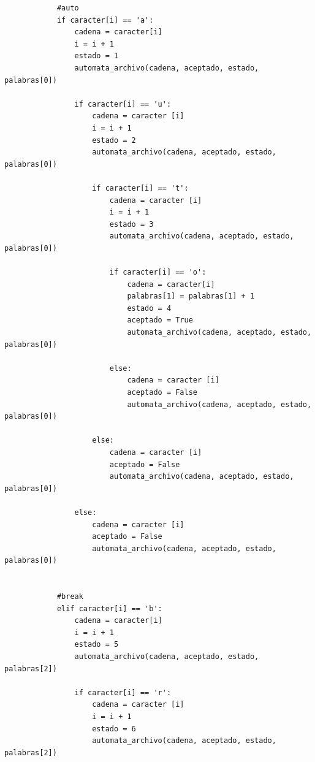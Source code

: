\documentclass{article}
\begin{document}
\begin{flushleft}
\begin{lstlisting}
            #auto
            if caracter[i] == 'a':
                cadena = caracter[i]
                i = i + 1
                estado = 1
                automata_archivo(cadena, aceptado, estado, palabras[0])
                
                if caracter[i] == 'u':
                    cadena = caracter [i]
                    i = i + 1
                    estado = 2
                    automata_archivo(cadena, aceptado, estado, palabras[0])   
                    
                    if caracter[i] == 't':
                        cadena = caracter [i]
                        i = i + 1
                        estado = 3
                        automata_archivo(cadena, aceptado, estado, palabras[0])
                        
                        if caracter[i] == 'o':
                            cadena = caracter[i]
                            palabras[1] = palabras[1] + 1
                            estado = 4
                            aceptado = True
                            automata_archivo(cadena, aceptado, estado, palabras[0])
                            
                        else:
                            cadena = caracter [i]
                            aceptado = False
                            automata_archivo(cadena, aceptado, estado, palabras[0])
                            
                    else:
                        cadena = caracter [i]
                        aceptado = False
                        automata_archivo(cadena, aceptado, estado, palabras[0])
                
                else:
                    cadena = caracter [i]
                    aceptado = False
                    automata_archivo(cadena, aceptado, estado, palabras[0])
                            
            
            #break
            elif caracter[i] == 'b':
                cadena = caracter[i]
                i = i + 1
                estado = 5
                automata_archivo(cadena, aceptado, estado, palabras[2])
                
                if caracter[i] == 'r':
                    cadena = caracter [i]
                    i = i + 1
                    estado = 6
                    automata_archivo(cadena, aceptado, estado, palabras[2])              
                    

\end{lstlisting}
\end{flushleft}
\end{document}
